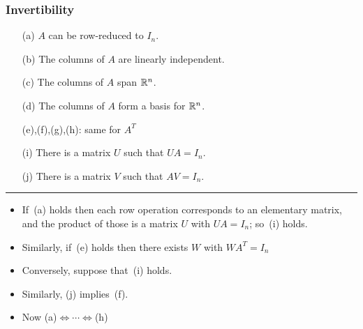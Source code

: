 \documentclass[9pt]{beamer}
\begin{document}
\begin{frame}[t]
 \frametitle{Invertibility }
  \begin{itemize}
   \item[(a)] $A$ can be row-reduced to $I_n$.
   \item[(b)] The columns of $A$ are linearly independent.
   \item[(c)] The columns of $A$ span ${\mathbb{R}}^n$.
   \item[(d)] The columns of $A$ form a basis for ${\mathbb{R}}^n$.
   \item[] (e),(f),(g),(h): same for $A^T$
   \item[(i)] There is a matrix $U$ such that $UA=I_n$.
   \item[(j)] There is a matrix $V$ such that $AV=I_n$.
  \end{itemize}

  \medskip

  \hrule

  \medskip
  \begin{itemize}
   \item<2-> If~(a) holds then each row operation corresponds to an
    elementary matrix, and the product of those is a matrix $U$ with
    $UA=I_n$; so~(i) holds.
   \item<3-> Similarly, if~(e) holds then there exists $W$ with
    $WA^T=I_n$ 
   \item<6-> Conversely, suppose that~(i) holds.
   \item<13-> Similarly, (j) implies~(f).
   \item<14-> Now (a)$\Leftrightarrow\dotsb\Leftrightarrow$(h) 
  \end{itemize}
\end{frame}
\end{document}
